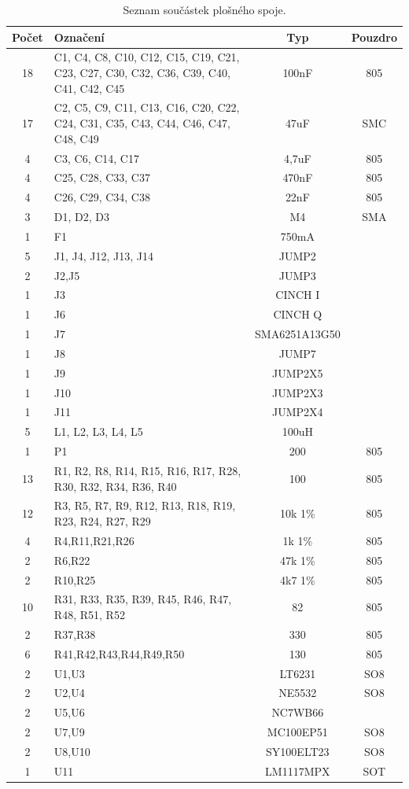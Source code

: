 \documentclass[12pt,a4paper,oneside]{article}
\begin{document}
\begin{table}[h!]
\begin{center}
\begin{tabular}{ |c|p{5cm}|c|c| }
\hline 
Počet & Označení & Typ  & Pouzdro  \\ 
\hline 
18	&	C1, C4, C8, C10, C12, C15, C19, C21, C23, C27, C30, C32, C36, C39, C40, C41, C42, C45	&	100nF	&	805	\\
17	&	C2, C5, C9, C11, C13, C16, C20, C22, C24, C31, C35, C43, C44, C46, C47, C48, C49	&	47uF	&	SMC	\\
4	&	C3, C6, C14, C17	&	4,7uF	&	805	\\
4	&	C25, C28, C33, C37	&	470nF	&	805	\\
4	&	C26, C29, C34, C38	&	22nF	&	805	\\
3	&	D1, D2, D3	&	M4	&	SMA	\\
1	&	F1	&	750mA	&		\\
5	&	J1, J4, J12, J13, J14	&	JUMP2	&		\\
2	&	J2,J5	&	JUMP3	&		\\
1	&	J3	&	CINCH I	&		\\
1	&	J6	&	CINCH Q	&		\\
1	&	J7	&	SMA6251A13G50	&		\\
1	&	J8	&	JUMP7	&		\\
1	&	J9	&	JUMP2X5	&		\\
1	&	J10	&	JUMP2X3	&		\\
1	&	J11	&	JUMP2X4	&		\\
5	&	L1, L2, L3, L4, L5	&	100uH	&		\\
1	&	P1	&	200	&	805	\\
13	&	R1, R2, R8, R14, R15, R16, R17, R28, R30, R32, R34, R36, R40	&	100	&	805	\\
12	&	R3, R5, R7, R9, R12, R13, R18, R19, R23, R24, R27, R29	&	10k 1\%	&	805	\\
4	&	R4,R11,R21,R26	&	1k 1\%	&	805	\\
2	&	R6,R22	&	47k 1\%	&	805	\\
2	&	R10,R25	&	4k7 1\%	&	805	\\
10	&	R31, R33, R35, R39, R45, R46, R47, R48, R51, R52	&	82	&	805	\\
2	&	R37,R38	&	330	&	805	\\
6	&	R41,R42,R43,R44,R49,R50	&	130	&	805	\\
2	&	U1,U3	&	LT6231	&	SO8	\\
2	&	U2,U4	&	NE5532	&	SO8	\\
2	&	U5,U6	&	NC7WB66	&		\\
2	&	U7,U9	&	MC100EP51	&	SO8	\\
2	&	U8,U10	&	SY100ELT23	&	SO8	\\
1	&	U11	&	LM1117MPX	&	SOT	\\
\hline 
\end{tabular}
\end{center}
\caption{Seznam součástek plošného spoje.}
\label{seznam_soucastek}
\end{table}
\end{document}
